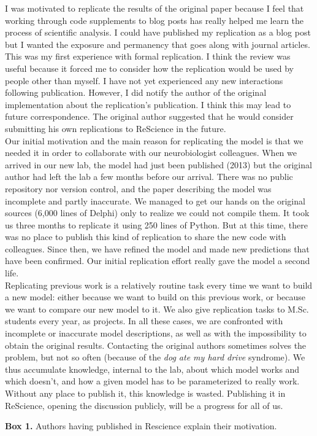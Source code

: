 \documentclass[11pt]{article}
\begin{document}
\begin{tcolorbox}
\begin{footnotesize}
\textbf{\cite{stachelek:2016}} I was motivated to replicate the results of
the original paper because I feel that working through code supplements to blog
posts has really helped me learn the process of scientific analysis. I could 
have published my replication as a blog post but I wanted the exposure and 
permanency that goes along with journal articles. This was my first experience 
with formal replication. I think the review was useful because it forced me to 
consider how the replication would be used by people other than myself. I have 
not yet experienced any new interactions following publication. However, I did 
notify the author of the original implementation about the replication's 
publication. I think this may lead to future correspondence. The original author suggested that he would consider submitting his own replications to
ReScience in the future.\\

\textbf{\cite{topalidou:2015b}} Our initial motivation and the main reason
for replicating the model is that we needed it in order to collaborate with our
neurobiologist colleagues. When we arrived in our new lab, the model had just
been published (2013) but the original author had left the lab a few months before
our arrival. There was no public repository nor version control, and the paper
describing the model was incomplete and partly inaccurate. We managed to get
our hands on the original sources (6,000 lines of Delphi) only to realize we
could not compile them. It took us three months to replicate it using 250 lines
of Python. But at this time, there was no place to publish this kind of
replication to share the new code with colleagues. Since then, we have refined
the model and made new predictions that have been confirmed. Our initial
replication effort really gave the model a second life.\\

\textbf{\cite{viejo:2016}} Replicating previous work is a relatively routine
task every time we want to build a new model: either because we want to build
on this previous work, or because we want to compare our new model to it. We also give replication tasks to
M.Sc. students every year, as projects. In all these cases, we are confronted
with incomplete or inaccurate model descriptions, as well as with the impossibility
to obtain the original results. Contacting the original authors sometimes
solves the problem, but not so often (because of the {\em dog ate my hard
  drive} syndrome). We thus accumulate knowledge, internal to the lab, about
which model works and which doesn't, and how a given model has to be parameterized
to really work. Without any place to publish it, this knowledge is
wasted. Publishing it in ReScience, opening the discussion publicly, will be a
progress for all of us.\\ \par
\end{footnotesize}
\noindent \textbf{Box 1.} Authors having  published in Rescience explain their motivation.
\end{tcolorbox}
~\\
\end{document}
